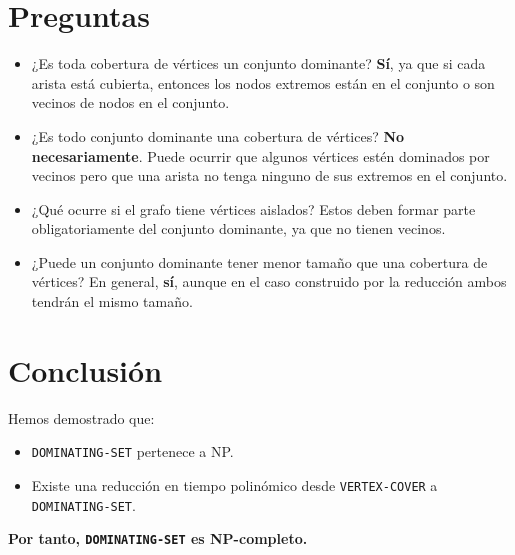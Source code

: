 \documentclass[a4paper,12pt]{article}
\begin{document}
\section{Preguntas}

\begin{itemize}
    \item ¿Es toda cobertura de vértices un conjunto dominante? \textbf{Sí}, ya que si cada arista está cubierta, entonces los nodos extremos están en el conjunto o son vecinos de nodos en el conjunto.
    \item ¿Es todo conjunto dominante una cobertura de vértices? \textbf{No necesariamente}. Puede ocurrir que algunos vértices estén dominados por vecinos pero que una arista no tenga ninguno de sus extremos en el conjunto.
    \item ¿Qué ocurre si el grafo tiene vértices aislados? Estos deben formar parte obligatoriamente del conjunto dominante, ya que no tienen vecinos.
    \item ¿Puede un conjunto dominante tener menor tamaño que una cobertura de vértices? En general, \textbf{sí}, aunque en el caso construido por la reducción ambos tendrán el mismo tamaño.
\end{itemize}

\section{Conclusión}
Hemos demostrado que:
\begin{itemize}
    \item \texttt{DOMINATING-SET} pertenece a NP.
    \item Existe una reducción en tiempo polinómico desde \texttt{VERTEX-COVER} a \texttt{DOMINATING-SET}.
\end{itemize}

\textbf{Por tanto, \texttt{DOMINATING-SET} es NP-completo.}
\end{document}
